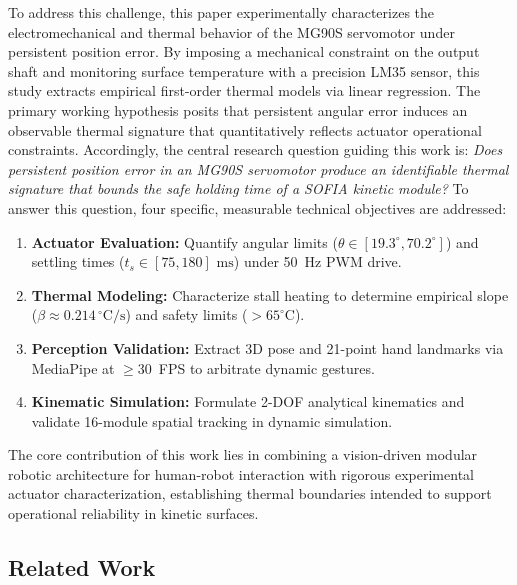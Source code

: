 \documentclass[lettersize,journal]{IEEEtran}
\begin{document}
	To address this challenge, this paper experimentally characterizes the electromechanical and thermal behavior of the MG90S servomotor under persistent position error. By imposing a mechanical constraint on the output shaft and monitoring surface temperature with a precision LM35 sensor, this study extracts empirical first-order thermal models via linear regression. The primary working hypothesis posits that persistent angular error induces an observable thermal signature that quantitatively reflects actuator operational constraints. Accordingly, the central research question guiding this work is: \textit{Does persistent position error in an MG90S servomotor produce an identifiable thermal signature that bounds the safe holding time of a SOFIA kinetic module?} To answer this question, four specific, measurable technical objectives are addressed:
	\begin{enumerate}
		\setlength{\itemsep}{0pt}
		\setlength{\parskip}{0pt}
		\setlength{\parsep}{0pt}
		\item {}\textbf{Actuator Evaluation:} Quantify angular limits ($\theta \in [19.3^\circ, 70.2^\circ]$) and settling times ($t_s \in [75, 180]\text{ ms}$) under 50~Hz PWM drive.
		\item {}\textbf{Thermal Modeling:} Characterize stall heating to determine empirical slope ($\beta \approx 0.214\,^\circ\text{C/s}$) and safety limits ($>65^\circ\text{C}$).
		\item {}\textbf{Perception Validation:} Extract 3D pose and 21-point hand landmarks via MediaPipe at $\ge 30$~FPS to arbitrate dynamic gestures.
		\item {}\textbf{Kinematic Simulation:} Formulate 2-DOF analytical kinematics and validate 16-module spatial tracking in dynamic simulation.
	\end{enumerate}
	The core contribution of this work lies in combining a vision-driven modular robotic architecture for human-robot interaction with rigorous experimental actuator characterization, establishing thermal boundaries intended to support operational reliability in kinetic surfaces.
	
	\subsection{Related Work}
	\label{sec:related_work}
	
\end{document}
